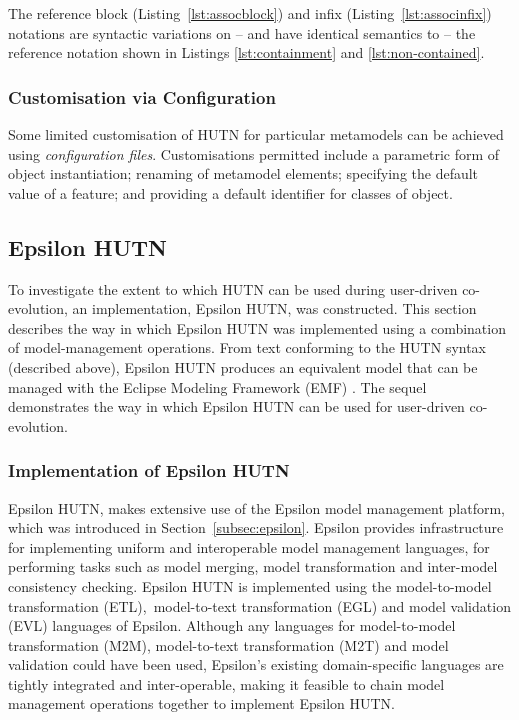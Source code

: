 The reference block (Listing~\ref{lst:assocblock}) and infix (Listing~\ref{lst:associnfix}) notations are syntactic variations on -- and have identical semantics to -- the reference notation shown in Listings \ref{lst:containment} and \ref{lst:non-contained}.


\subsubsection{Customisation via Configuration}
Some limited customisation of HUTN for particular metamodels can be achieved using \emph{configuration files}. Customisations permitted include a parametric form of object instantiation; renaming of metamodel elements; specifying the default value of a feature; and providing a default identifier for classes of object.


\subsection{Epsilon HUTN}
\label{subsec:epsilon_hutn}
To investigate the extent to which HUTN can be used during user-driven co-evolution, an implementation, Epsilon HUTN, was constructed. This section describes the way in which Epsilon HUTN was implemented using a combination of model-management operations. From text conforming to the HUTN syntax (described above), Epsilon HUTN produces an equivalent model that can be managed with the Eclipse Modeling Framework (EMF) \cite{steinberg09emf}. The sequel demonstrates the way in which Epsilon HUTN can be used for user-driven co-evolution.

\subsubsection{Implementation of Epsilon HUTN}
Epsilon HUTN, makes extensive use of the Epsilon model management platform, which was introduced in Section~\ref{subsec:epsilon}. Epsilon provides infrastructure for implementing uniform and interoperable model management languages, for performing tasks such as model merging, model transformation and inter-model consistency checking. Epsilon HUTN is implemented using the model-to-model transformation (ETL), model-to-text transformation (EGL) and model validation (EVL) languages of Epsilon. Although any languages for model-to-model transformation 
(M2M), model-to-text transformation (M2T) and model validation could have been used, Epsilon's existing domain-specific languages are tightly integrated and inter-operable, making it feasible to chain model management operations together to implement Epsilon HUTN.

